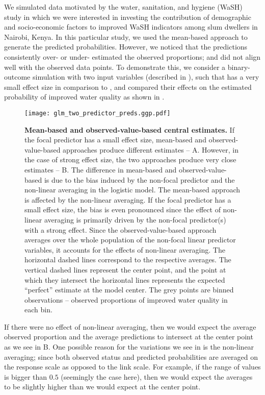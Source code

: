 We simulated data motivated by the water, sanitation, and hygiene (WaSH) study in which we were interested in investing the contribution of demographic and socio-economic factors to improved WaSH indicators among slum dwellers in Nairobi, Kenya. In this particular study, we used the mean-based approach to generate the predicted probabilities. However, we noticed that the predictions consistently over- or under- estimated the observed proportions; and did not align well with the observed data points. To demonstrate this, we consider a binary-outcome simulation with two input variables (described in ), such that  has a very small effect size in comparison to , and compared their effects on the estimated probability of improved water quality as shown in .
%
\begin{figure}
\begin{center}
\texttt{[image: glm\_two\_predictor\_preds.ggp.pdf]}
\end{center}
\caption{{\bf Mean-based and observed-value-based central estimates.} If the focal predictor has a small effect size, mean-based and observed-value-based approaches produce different estimates -- A. However, in the case of strong effect size, the two approaches produce very close estimates -- B. The difference in mean-based and observed-value-based is due to the bias induced by the non-focal predictor and the non-linear averaging in the logistic model. The mean-based approach is affected by the non-linear averaging. If the focal predictor has a small effect size, the bias is even pronounced since the effect of non-linear averaging is primarily driven by the non-focal predictor(s) with a strong effect. Since the observed-value-based approach averages over the whole population of the non-focal linear predictor variables, it accounts for the effects of non-linear averaging. The horizontal dashed lines correspond to the respective averages. The vertical dashed lines represent the center point, and the point at which they intersect the horizontal lines represents the expected ``perfect'' estimate at the model center. The grey points are binned observations -- observed proportions of improved water quality in each bin.} 
\label{fig:pred_bin_plots}
\end{figure}
%
If there were no effect of non-linear averaging, then we would expect the average observed proportion and the average predictions to intersect at the center point as we see in B. One possible reason for the variations we see in  is the non-linear averaging; since both observed status and predicted probabilities are averaged on the response scale as opposed to the link scale. For example, if the range of values is bigger than $0.5$ (seemingly the case here), then we would expect the averages to be slightly higher than we would expect at the center point.

